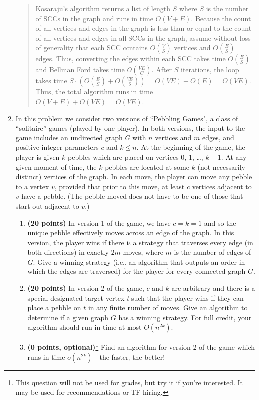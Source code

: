 \documentclass[11pt]{article}
\begin{document}
\begin{enumerate}
\begin{quote}
\medskip
Kosaraju's algorithm returns a list of length $S$ where $S$ is the number of SCCs in the graph and runs in time $O(V + E)$. Because the count of all vertices and edges in the graph is less than or equal to the count of all vertices and edges in all SCCs in the graph, assume without loss of generality that each SCC contains $O(\frac{V}{S})$ vertices and $O(\frac{E}{S})$ edges. Thus, converting the edges within each SCC takes time $O(\frac{E}{S})$ and Bellman Ford takes time $O(\frac{VE}{C})$. After $S$ iterations, the loop takes time $S \cdot (O(\frac{E}{S}) + O(\frac{VE}{S})) = O(VE) + O(E) = O(VE)$. Thus, the total algorithm runs in time $O(V + E) + O(VE) = O(VE)$. 
\end{quote}

\item %
In this problem we consider two versions of ``Pebbling Games", a class of ``solitaire'' games (played by one player). In both versions, the input to the game  includes an undirected graph $G$ with $n$ vertices and $m$ edges, and positive integer parameters $c$ and $k\le n$. At the beginning of the game, the player is given $k$ pebbles which are placed on vertices $0$, $1$, \ldots, $k-1$. At any given moment of time, the $k$ pebbles are located at some $k$ (not necessarily distinct) vertices of the graph. In each move, the player can move any pebble to a vertex $v$, provided that prior to this move, at least $c$ vertices adjacent to $v$ have a pebble. (The pebble moved does not have to be one of those that start out adjacent to $v$.)
\begin{enumerate}
    \item 
    {\bf (20 points)}
    In version 1 of the game, we have $c=k=1$ and so the unique pebble effectively moves across an edge of the graph. In this version, the player wins if there is a strategy that traverses every edge (in both directions) in exactly $2m$ moves, where $m$ is the number of edges of $G$. Give a winning strategy (i.e., an algorithm that outputs an order in which the edges are traversed) for the player for every connected graph $G$. 
    \item 
    {\bf (20 points)}
    In version 2 of the game, $c$ and $k$ are arbitrary and there is a special designated target vertex $t$ such that the player wins if they can place a pebble on $t$ in any finite number of moves. Give an algorithm to determine if a given graph $G$ has a winning strategy. For full credit, your algorithm should run in time at most $O(n^{2k})$. 
    \item {\bf (0 points, optional)}\footnote{This question will not be used for grades, but try it if you're interested.
    It may be used for recommendations or TF hiring.} 
    Find an algorithm for version 2 of the game which runs in time $o(n^{2k})$---the faster, the better!
\end{enumerate} 


\end{enumerate}
\end{document}
